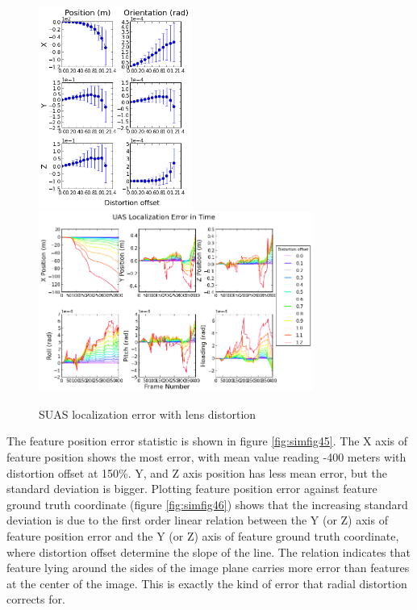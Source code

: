 \begin{figure}[h]
  \centering
  \includegraphics[width=5cm,keepaspectratio=true]{./Figures/SimulationFigures/Figure47.png}
  \includegraphics[width=9cm,keepaspectratio=true]{./Figures/SimulationFigures/Figure48.png}
  \caption{SUAS localization error with lens distortion}
  \label{fig:simfig48}
\end{figure}

The feature position error statistic is shown in figure
\ref{fig:simfig45}. The X axis of feature position shows the most
error, with mean value reading -400 meters with distortion offset at
150\%. Y, and Z axis position has less mean error, but the standard
deviation is bigger. Plotting feature position error against feature
ground truth coordinate (figure \ref{fig:simfig46}) shows that the
increasing standard deviation is due to the first order linear
relation between the Y (or Z) axis of feature position error and the Y
(or Z) axis of feature ground truth coordinate, where distortion
offset determine the slope of the line. The relation indicates that
feature lying around the sides of the image plane carries more error
than features at the center of the image. This is exactly the kind of
error that radial distortion corrects for. 

